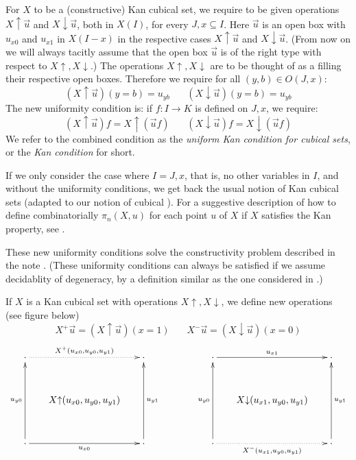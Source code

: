 \documentclass[10pt,a4paper]{article}
\newcommand{\rup}[1]{#1{\uparrow}}
\newcommand{\rdo}[1]{#1{\downarrow}}
\begin{document}
 For $X$ to be a (constructive) Kan cubical set, we require to be given operations
$\rup{X} \vec u$ and $\rdo{X} \vec u$, both in $X(I)$, for every $J,x\subseteq I$.
Here $\vec u$ is an open box with $u_{x0}$ and $u_{x1}$ in $X(I-x)$ in the
respective cases $\rup{X} \vec u$ and $\rdo{X} \vec u$. (From now on we will always
tacitly assume that the open box $\vec u$ is of the right type with respect to $\rup{X},\rdo{X}$.)
The operations $\rup{X},\rdo{X}$ are to be thought of as a filling their
respective open boxes. Therefore we require for all $(y,b)\in O(J,x)$:
$$
(\rup{X} \vec u) (y=b) = u_{yb}~~~~~~~~(\rdo{X} \vec u) (y=b) = u_{yb}
$$
The new uniformity condition is: if $f:I\to K$ is defined on $J,x$, we require:
$$
(\rup{X} \vec u) f = \rup{X} (\vec{u}f)~~~~~~~~(\rdo{X} \vec u) f = \rdo{X} (\vec{u}f)
$$
We refer to the combined condition as the \emph{uniform Kan condition for cubical sets},
or the \emph{Kan condition} for short. %

If we only consider the case where $I = J,x$, that is, no other
variables in $I$, and without the uniformity conditions, we get back
the usual notion of Kan cubical sets \cite[Section 4]{Kan} (adapted to
our notion of cubical ).  For a suggestive description of how to
define combinatorially $\pi_n(X,u)$ for each point $u$ of $X$ if $X$
satisfies the Kan property, see \cite{Williamson}.

 These new uniformity conditions solve the constructivity problem described in the note \cite{BC}.
(These uniformity conditions can always be satisfied if we assume decidablity of degeneracy, by a definition similar
as the one considered in \cite{BCH}.)

If $X$ is a Kan cubical set with operations $\rup{X},\rdo{X}$, we define new operations (see figure below)
$$
X^+\vec u = (\rup{X} \vec u)(x=1)~~~~~~~~X^-\vec u = (\rdo{X} \vec u)(x=0)$$
\def\noe{\cdot}
\[
\xymatrix@R=1.1cm@C=.6cm{
\noe\ar@{.>}[rr]^{X^+(u_{x0}, u_{y0},u_{y1})}&      & \noe                                     &&&
\noe\ar[rr]^{u_{x1}}                                 &      & \noe      \\
                                      &\rup{X}(u_{x0}, u_{y0},u_{y1})&                          &&&
                                      &\rdo{X}(u_{x1}, u_{y0},u_{y1})&                              \\
\noe\ar[rr]_{u_{x0}}\ar[uu]^{u_{y0}}&      & \noe\ar[uu]_{u_{y1}}                                     &&&
\noe\ar@{.>}[rr]_{X^-(u_{x1}, u_{y0},u_{y1})}\ar[uu]^{u_{y0}}     &      & \noe\ar[uu]_{u_{y1}}                       \\
}
\]
\end{document}
